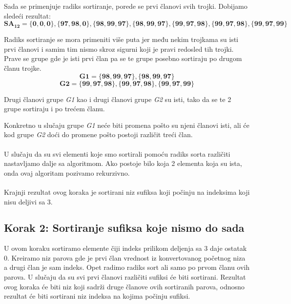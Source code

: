 \documentclass[serbian]{article}
\begin{document}
Sada se primenjuje radiks sortiranje, porede se prvi članovi svih trojki. Dobijamo sledeći rezultat:
\begin{equation}
\mathbf{SA_{12} =  \{0, 0, 0\}, \{97, 98, 0\} ,\{98, 99, 97\}, \{98, 99, 97\}, \{99, 97, 98\} , \{99, 97, 98\} , \{99, 97, 99\} }
\end{equation}

Radiks sortiranje se mora primeniti više puta jer među nekim trojkama su isti prvi članovi i samim tim nismo skroz sigurni koji je pravi redosled tih trojki. Prave se grupe gde je isti prvi član pa se te grupe posebno sortiraju po drugom članu trojke.
\begin{equation}
\mathbf{G1 = \{98, 99, 97\}, \{98, 99, 97\}}
\end{equation}
\begin{equation}
\mathbf{G2 = \{99, 97, 98\} , \{99, 97, 98\} , \{99, 97, 99\}}
\end{equation}

Drugi članovi grupe \textit{G1} kao i drugi članovi grupe \textit{G2} su isti, tako da se te 2 grupe sortiraju i po trećem članu.

Konkretno u slučaju grupe \textit{G1} neće biti promena pošto su njeni članovi isti, ali će kod grupe \textit{G2} doći do promene pošto postoji različit treći član.\\\\


U slučaju da su svi elementi koje smo sortirali pomoću radiks sorta različiti nastavljamo dalje sa algoritmom. Ako postoje bilo koja 2 elementa koja su ista, onda ovaj algoritam pozivamo rekurzivno.\\\\

Krajnji rezultat ovog koraka je sortirani niz sufiksa koji počinju na indeksima koji nisu deljivi sa 3.

\subsection{Korak 2: Sortiranje sufiksa koje nismo do sada}
U ovom koraku sortiramo elemente čiji indeks prilikom deljenja sa 3 daje ostatak 0.
Kreiramo niz parova gde je prvi član vrednost iz konvertovanog početnog niza a drugi član je sam indeks.
Opet radimo radiks sort ali samo po prvom članu ovih parova. U slučaju da su svi prvi članovi različiti sufiksi će biti sortirani. Rezultat ovog koraka će biti niz koji sadrži druge članove ovih sortiranih parova, odnosno rezultat će biti sortirani niz indeksa na kojima počinju sufiksi.
\end{document}
